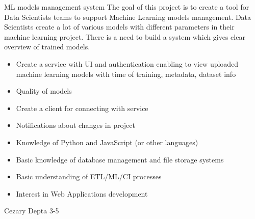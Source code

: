 \begin{project}
{ML models management system}
{
The goal of this project is to create a tool for Data Scientists teams to support Machine Learning models management. Data Scientists create a lot of various models with different parameters in their machine learning project. There is a need to build a system which gives clear overview of trained models.
}
{
\begin{itemize}
	\item Create a service with UI and authentication enabling to view uploaded machine learning models with time of training, metadata, dataset info
	\item Quality of models
	\item Create a client for connecting with service
	\item Notifications about changes in project
\end{itemize}
}
{
\begin{itemize}
	\item Knowledge of Python and JavaScript (or other languages)
	\item Basic knowledge of database management and file storage systems
	\item Basic understanding of ETL/ML/CI processes
	\item Interest in Web Applications development
\end{itemize}
}
{Cezary Depta}
{3-5}
\end{project}